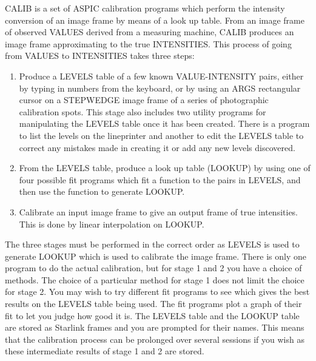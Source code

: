 CALIB is a set of ASPIC calibration programs which perform the intensity
conversion of an image frame by means of a look up table.
From an image frame of observed VALUES derived from a measuring machine, CALIB
produces an image frame approximating to the true INTENSITIES.
This process of going from VALUES to INTENSITIES takes three steps:
\begin{enumerate}
\item Produce a LEVELS table of a few known VALUE-INTENSITY pairs, either by
typing in numbers from the keyboard, or by using an ARGS rectangular cursor on
a STEPWEDGE image frame of a series of photographic calibration spots.
This stage also includes two utility programs for manipulating the LEVELS table
once it has been created.
There is a program to list the levels on the lineprinter and another to edit the
LEVELS table to correct any mistakes made in creating it or add any new levels
discovered.
\item From the LEVELS table, produce a look up table (LOOKUP) by using one of four
possible fit programs which fit a function to the pairs in LEVELS, and then use
the function to generate LOOKUP.
\item Calibrate an input image frame to give an output frame of true intensities.
This is done by linear interpolation on LOOKUP.
\end{enumerate}
The three stages must be performed in the correct order as LEVELS is used to
generate LOOKUP which is used to calibrate the image frame.
There is only one program to do the actual calibration, but for stage 1 and 2
you have a choice of methods.
The choice of a particular method for stage 1 does not limit the choice for
stage 2.
You may wish to try different fit programs to see which gives the best
results on the LEVELS table being used.
The fit programs plot a graph of their fit to let you judge how good it is.
The LEVELS table and the LOOKUP table are stored as Starlink frames
and you are prompted for their names.
This means that the calibration process can be prolonged over several sessions
if you wish as these intermediate results of stage 1 and 2 are stored.
